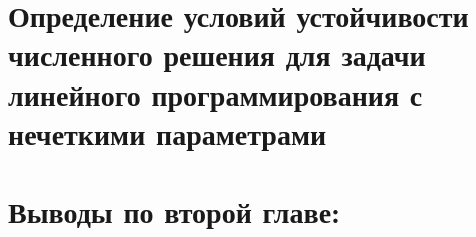 \section{Определение условий устойчивости численного решения для задачи линейного программирования с нечеткими параметрами} 
\label{chapter2_4}


\newpage
\section*{Выводы по второй главе:} 
\label{chapter2_5}
